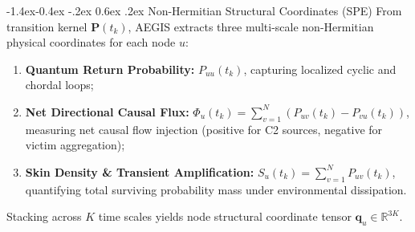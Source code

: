 \documentclass[10pt,twocolumn,letterpaper]{article}
\makeatletter
\renewcommand\subsection{\@startsection{subsection}{2}{\z@}%
                                     {-1.4ex\@plus -0.4ex \@minus -.2ex}%
                                     {0.6ex \@plus .2ex}%
                                     {\normalfont\normalsize\bfseries}}
\makeatother
\begin{document}
\subsection{Non-Hermitian Structural Coordinates (SPE)}
From transition kernel $\mathbf{P}(t_k)$, AEGIS extracts three multi-scale non-Hermitian physical coordinates for each node $u$:
\begin{enumerate}
    \item \textbf{Quantum Return Probability:} $P_{uu}(t_k)$, capturing localized cyclic and chordal loops;
    \item \textbf{Net Directional Causal Flux:} $\Phi_u(t_k) = \sum_{v=1}^N (P_{uv}(t_k) - P_{vu}(t_k))$, measuring net causal flow injection (positive for C2 sources, negative for victim aggregation);
    \item \textbf{Skin Density \& Transient Amplification:} $S_u(t_k) = \sum_{v=1}^N P_{uv}(t_k)$, quantifying total surviving probability mass under environmental dissipation.
\end{enumerate}
Stacking across $K$ time scales yields node structural coordinate tensor $\mathbf{q}_u \in \mathbb{R}^{3K}$.
\end{document}
